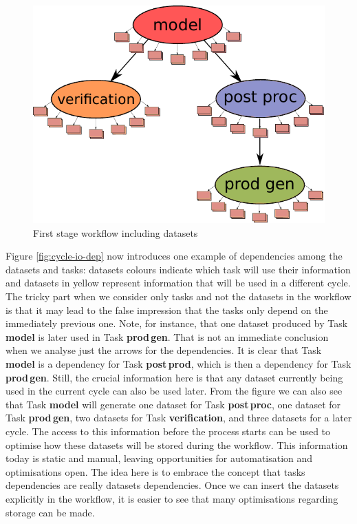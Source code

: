 \documentclass[a4paper]{article}
\begin{document}
\begin{figure}[H]
  \centering
  \includegraphics[width=0.6\columnwidth]{cycle-io}
  \caption{First stage workflow including datasets}
  \label{fig:cycle-io}
\end{figure}

Figure \ref{fig:cycle-io-dep} now introduces one example of dependencies among the datasets and tasks: datasets colours indicate which task will use their information and datasets in yellow represent information that will be used in a different cycle. The tricky part when we consider only tasks and not the datasets in the workflow is that it may lead to the false impression that the tasks only depend on the immediately previous one. Note, for instance, that one dataset produced by Task \textbf{model} is later used in Task \textbf{prod\,gen}. That is not an immediate conclusion when we analyse just the arrows for the dependencies. It is clear that Task \textbf{model} is a dependency for Task \textbf{post\,prod}, which is then a dependency for Task \textbf{prod\,gen}. Still, the crucial information here is that any dataset currently being used in the current cycle can also be used later. From the figure we can also see that Task \textbf{model} will generate one dataset for Task \textbf{post\,proc}, one dataset for Task \textbf{prod\,gen}, two datasets for Task \textbf{verification}, and three datasets for a later cycle.
The access to this information before the process starts can be used to optimise how these datasets will be stored during the workflow. This information today is static and manual, leaving opportunities for automatisation and optimisations open.
The idea here is to embrace the concept that tasks dependencies are really datasets dependencies. Once we can insert the datasets explicitly in the workflow, it is easier to see that many optimisations regarding storage can be made.
\end{document}
